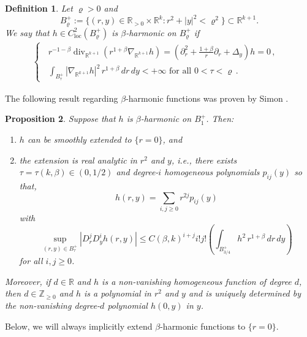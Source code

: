\documentclass[11pt, letterpaper, reqno]{amsart}
\numberwithin{equation}{section}
\newtheorem{Def}{Definition}[section]
\newtheorem{Prop}[Def]{Proposition}
\theoremstyle{remark}
\newcommand{\RR}{\mathbb{R}}
\newcommand{\ZZ}{\mathbb{Z}}
\newcommand{\loc}{\mathrm{loc}}
\begin{document}
    

\begin{Def} \label{defi:beta.harmonic}
	Let $\varrho > 0$ and
	\[ B^+_\varrho:=\{(r,y) \in \RR_{>0}\times \RR^k : r^2 + |y|^2 < \varrho^2\} \subset \RR^{k+1}. \]
	We say that $h \in C^2_\loc(B^+_\varrho)$ is $\beta$-harmonic on $B^+_\varrho$ if
	\begin{align}
       \begin{cases}
        \;\; r^{-1-\beta} \operatorname{div}_{\RR^{k+1}}(r^{1+\beta} \nabla_{\RR^{k+1}} h) = \displaystyle\left(\partial_r^2 + \tfrac{1+\beta}{r}\partial_r + \Delta_y\right)h = 0\,, & \\
        \;\; \displaystyle\int_{B^+_\tau} |\nabla_{\RR^{k+1}} h|^2 \, r^{1+\beta} \, dr \, dy < +\infty \text{ for all } 0 < \tau < \varrho \,.
       \end{cases} \label{Equ_Jac field_beta harmonic equ}
      \end{align}
\end{Def}

The following result regarding $\beta$-harmonic functions was proven by Simon \cite[Section 3 \& Appendix A.19]{Simon:liouville}.

    \begin{Prop} \label{Prop_Jac field_beta harmonic}
      Suppose that $h$ is $\beta$-harmonic on $B^+_1$. Then:
      \begin{enumerate}
      	\item $h$ can be smoothly extended to $\{r=0\}$, and
	\item the extension is real analytic in $r^2$ and $y$, i.e., there exists $\tau=\tau(k, \beta)\in (0, 1/2)$ and degree-$i$ homogeneous polynomials $p_{ij}(y)$ so that,
      \[ h(r, y) = \sum_{i, j\geq 0} r^{2j}p_{ij}(y) \]
      with
      \[ \sup_{(r, y)\in B_{\tau}^+} |D_r^jD_y^i h(r, y)| \leq C(\beta, k)^{i+j}i!j!\left(\int_{B_{3/4}^+} h^2 \, r^{1+\beta} \, dr \, dy\right) \]
      for all $i, j \geq 0$.
      \end{enumerate}
      Moreover, if $d\in \RR$ and $h$ is a non-vanishing homogeneous function of degree $d$, then $d \in \ZZ_{\geq 0}$ and $h$ is a polynomial in $r^2$ and $y$ and is uniquely determined by the non-vanishing degree-$d$ polynomial $h(0, y)$ in $y$.  
\end{Prop}

Below, we will always implicitly extend $\beta$-harmonic functions to $\{r=0\}$. 
\end{document}
